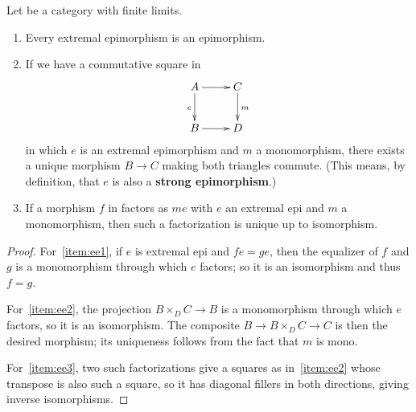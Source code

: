 \begin{lem}\label{thm:extremal-epi}
  Let \cS be a category with finite limits.
  \begin{enumerate}
  \item Every extremal epimorphism is an epimorphism.\label{item:ee1}
  \item If we have a commutative square in \cS
    \[ \xymatrix{ A \ar[r] \ar[d]_e & C \ar[d]^m \\ B \ar[r] & D} \]
    in which $e$ is an extremal epimorphism and $m$ a monomorphism, there exists a unique morphism $B\to C$ making both triangles commute.
    (This means, by definition, that $e$ is also a \textbf{strong epimorphism}.)\label{item:ee2}
  \item If a morphism $f$ in \cS factors as $m e$ with $e$ an extremal epi and $m$ a monomorphism, then such a factorization is unique up to isomorphism.\label{item:ee3}
  \end{enumerate}
\end{lem}
\begin{proof}
  For~\ref{item:ee1}, if $e$ is extremal epi and $f e = g e$, then the equalizer of $f$ and $g$ is a monomorphism through which $e$ factors; so it is an isomorphism and thus $f=g$.

  For~\ref{item:ee2}, the projection $B\times_D C \to B$ is a monomorphism through which $e$ factors, so it is an isomorphism.
  The composite $B\to B\times_D C \to C$ is then the desired morphism; its uniqueness follows from the fact that $m$ is mono.

  For~\ref{item:ee3}, two such factorizations give a squares as in~\ref{item:ee2} whose transpose is also such a square, so it has diagonal fillers in both directions, giving inverse isomorphisms.
\end{proof}

